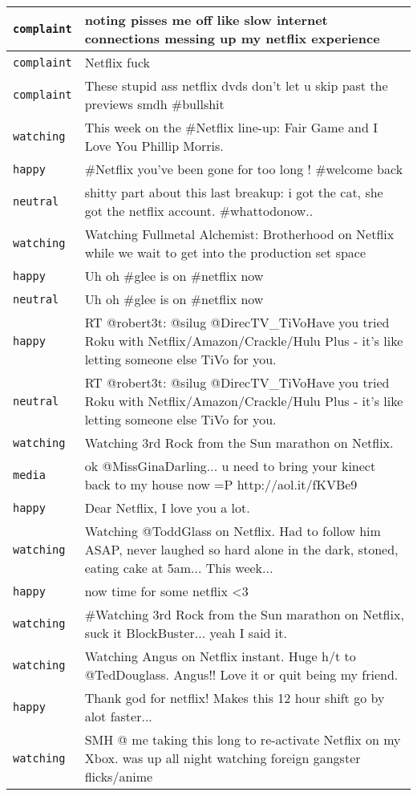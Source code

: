 \begin{center}
\begin{longtable}{|l|p{120mm}|}
      \tabularnewline\hline
         \texttt{complaint} & noting pisses me off like slow internet connections messing up my netflix experience
      \tabularnewline\hline
         \texttt{complaint} & Netflix fuck
      \tabularnewline\hline
         \texttt{complaint} & These stupid ass netflix dvds don't let u skip past the previews smdh \#bullshit
      \tabularnewline\hline
         \texttt{watching} & This week on the \#Netflix line-up: Fair Game and I Love You Phillip Morris.
      \tabularnewline\hline
         \texttt{happy} & \#Netflix you've been gone for too long ! \#welcome back
      \tabularnewline\hline
         \texttt{neutral} & shitty part about this last breakup: i got the cat, she got the netflix account. \#whattodonow..
      \tabularnewline\hline
         \texttt{watching} & Watching Fullmetal Alchemist: Brotherhood on Netflix while we wait to get into the production set space
      \tabularnewline\hline
         \texttt{happy} & Uh oh \#glee is on \#netflix now
      \tabularnewline\hline
         \texttt{neutral} & Uh oh \#glee is on \#netflix now
      \tabularnewline\hline
         \texttt{happy} & RT @robert3t: @silug @DirecTV\_TiVoHave you tried Roku with Netflix/Amazon/Crackle/Hulu Plus - it's like letting someone else TiVo for you.
      \tabularnewline\hline
         \texttt{neutral} & RT @robert3t: @silug @DirecTV\_TiVoHave you tried Roku with Netflix/Amazon/Crackle/Hulu Plus - it's like letting someone else TiVo for you.
      \tabularnewline\hline
         \texttt{watching} & Watching 3rd Rock from the Sun marathon on Netflix.
      \tabularnewline\hline
         \texttt{media} & ok @MissGinaDarling... u need to bring your kinect back to my house now =P http://aol.it/fKVBe9
      \tabularnewline\hline
         \texttt{happy} & Dear Netflix, I love you a lot.
      \tabularnewline\hline
         \texttt{watching} & Watching @ToddGlass on Netflix. Had to follow him ASAP, never laughed so hard alone in the dark, stoned, eating cake at 5am... This week...
      \tabularnewline\hline
         \texttt{happy} & now time for some netflix <3
      \tabularnewline\hline
         \texttt{watching} & \#Watching 3rd Rock from the Sun marathon on Netflix, suck it BlockBuster... yeah I said it.
      \tabularnewline\hline
         \texttt{watching} & Watching Angus on Netflix instant. Huge h/t to @TedDouglass. Angus!! Love it or quit being my friend.
      \tabularnewline\hline
         \texttt{happy} & Thank god for netflix! Makes this 12 hour shift go by alot faster...
      \tabularnewline\hline
         \texttt{watching} & SMH @ me taking this long to re-activate Netflix on my Xbox. was up all night watching foreign gangster flicks/anime

\end{longtable}
\end{center}
